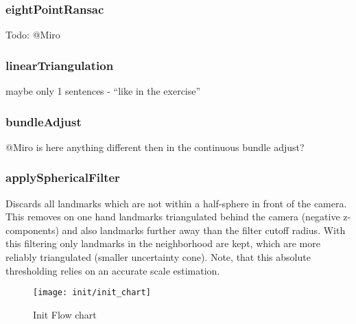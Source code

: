 \subsubsection{eightPointRansac}
Todo: @Miro

\subsubsection{linearTriangulation}
maybe only 1 sentences - ``like in the exercise''

\subsubsection{bundleAdjust}
@Miro
is here anything different then in the continuous bundle adjust?

\subsubsection{applySphericalFilter}
\label{sub_sec_sphFilter}
Discards all landmarks which are not within a half-sphere in front of the camera. This removes on one hand landmarks triangulated behind the camera (negative z-components) and also landmarks further away than the filter cutoff radius. With this filtering only landmarks in the neighborhood are kept, which are more reliably triangulated (smaller uncertainty cone). Note, that this absolute thresholding relies on an accurate scale estimation.

\begin{figure}[ht]
	\centering
	\texttt{[image: init/init\_chart]}
	\caption{Init Flow chart}
	\label{img_flow_init}
\end{figure}